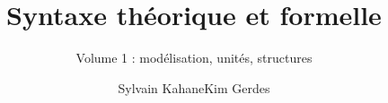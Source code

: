\author{Sylvain Kahane\lastand Kim Gerdes}
\title{Syntaxe théorique et formelle}
\subtitle{Volume 1 : modélisation, unités, structures}
\renewcommand{\lsSeries}{tbls}
\renewcommand{\lsSeriesNumber}{8}
\renewcommand{\lsID}{241}

